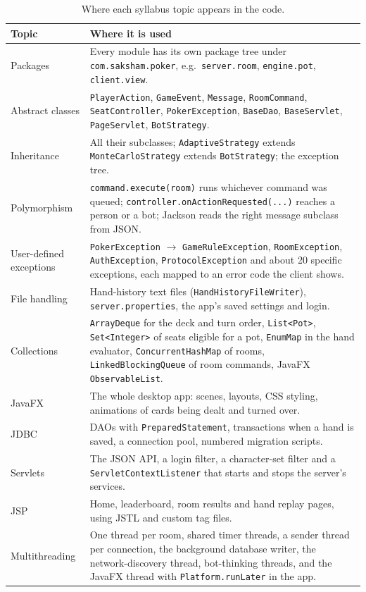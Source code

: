 \documentclass[12pt,a4paper]{article}
\newcommand{\cls}[1]{\texttt{#1}}
\begin{document}
\begin{table}[H]
\centering\small
\caption{Where each syllabus topic appears in the code.}
\begin{tabularx}{\textwidth}{@{}p{3.1cm}L@{}}
\toprule
Topic & Where it is used \\
\midrule
Packages & Every module has its own package tree under \cls{com.saksham.poker}, e.g.\
\cls{server.room}, \cls{engine.pot}, \cls{client.view}. \\
Abstract classes & \cls{PlayerAction}, \cls{GameEvent}, \cls{Message}, \cls{RoomCommand},
\cls{SeatController}, \cls{PokerException}, \cls{BaseDao}, \cls{BaseServlet},
\cls{PageServlet}, \cls{BotStrategy}. \\
Inheritance & All their subclasses; \cls{AdaptiveStrategy} extends \cls{MonteCarloStrategy}
extends \cls{BotStrategy}; the exception tree. \\
Polymorphism & \cls{command.execute(room)} runs whichever command was queued;
\cls{controller.onActionRequested(...)} reaches a person or a bot; Jackson reads the right
message subclass from JSON. \\
User-defined exceptions & \cls{PokerException} $\rightarrow$ \cls{GameRuleException},
\cls{RoomException}, \cls{AuthException}, \cls{ProtocolException} and about 20 specific
exceptions, each mapped to an error code the client shows. \\
File handling & Hand-history text files (\cls{HandHistoryFileWriter}),
\cls{server.properties}, the app's saved settings and login. \\
Collections & \cls{ArrayDeque} for the deck and turn order, \cls{List<Pot>},
\cls{Set<Integer>} of seats eligible for a pot, \cls{EnumMap} in the hand evaluator,
\cls{ConcurrentHashMap} of rooms, \cls{LinkedBlockingQueue} of room commands, JavaFX
\cls{ObservableList}. \\
JavaFX & The whole desktop app: scenes, layouts, CSS styling, animations of cards being
dealt and turned over. \\
JDBC & DAOs with \cls{PreparedStatement}, transactions when a hand is saved, a connection
pool, numbered migration scripts. \\
Servlets & The JSON API, a login filter, a character-set filter and a
\cls{ServletContextListener} that starts and stops the server's services. \\
JSP & Home, leaderboard, room results and hand replay pages, using JSTL and custom tag
files. \\
Multithreading & One thread per room, shared timer threads, a sender thread per connection,
the background database writer, the network-discovery thread, bot-thinking threads, and the
JavaFX thread with \cls{Platform.runLater} in the app. \\
\bottomrule
\end{tabularx}
\end{table}
\end{document}
